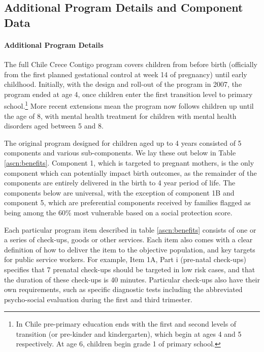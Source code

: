 \documentclass[12pt]{article}
\begin{document}
\begin{spacing}{1.4}
\clearpage
\setcounter{table}{0}
\renewcommand{\thetable}{B\arabic{table}}
\setcounter{figure}{0}
\renewcommand{\thefigure}{B\arabic{figure}}
\section{Additional Program Details and Component Data}
\label{app:program}
\paragraph{Additional Program Details}
The full Chile Crece Contigo program covers children from before
birth (officially from the first planned gestational control
at week 14 of pregnancy) until early childhood.  Initially, with
the design and roll-out of the program in 2007, the program
ended at age 4, once children enter the first transition level to
primary school.\footnote{In Chile pre-primary education ends with
  the first and second levels of transition (or pre-kinder and
  kindergarten), which begin at ages 4 and 5 respectively.  At age
  6, children begin grade 1 of primary school.}  More recent
extensions mean the program now follows children up until the
age of 8, with mental health treatment for children with mental
health disorders aged between 5 and 8.

The original program designed for children aged up to 4 years
consisted of 5 components and various sub-components.  We lay
these out below in Table \ref{ascn:benefits}.  Component
1, which is targeted to pregnant mothers, is the only component
which can potentially impact birth outcomes, as the remainder of
the components are entirely delivered in the birth to 4 year
period of life.  The components below are universal, with the
exception of component 1B and component 5, which are preferential
components received by families flagged as being among the
60\% most vulnerable based on a social protection score.

Each particular program item described in table \ref{ascn:benefits}
consists of one or a series of check-ups, goods or other
services.  Each item also comes with a clear definition of
how to deliver the item to the objective population, and key
targets for public service workers.  For example, Item 1A, Part
i (pre-natal check-ups) specifies that 7 prenatal check-ups
should be targeted in low risk cases, and that the duration of
these check-ups is 40 minutes.  Particular check-ups also have
their own requirements, such as specific diagnostic tests including
the abbreviated psycho-social evaluation during the first and
third trimester.


\end{spacing}
\end{document}
